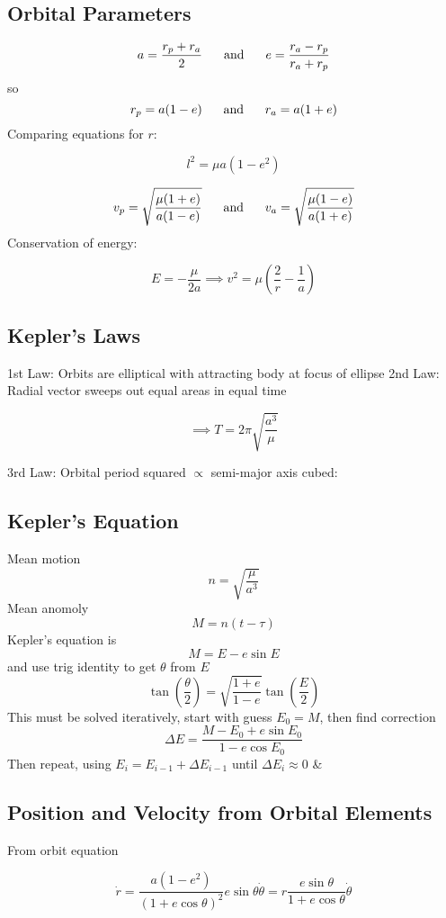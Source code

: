 \documentclass[table,cmyk,fleqn]{article}
\begin{document}
\begin{longtable}
\vspace{4cm}


\tabularnewline\hline
\section*{Orbital Parameters}
\[a=\frac{r_p+r_a}{2}\text{\hspace{0.6cm}and\hspace{0.6cm}}e=\frac{r_a-r_p}{r_a+r_p}\]
so
\[r_p=a(1-e)\text{\hspace{0.6cm}and\hspace{0.6cm}}r_a=a(1+e)\]
Comparing equations for $r$:
\begin{boldmath}\[l^2 = \mu a(1-e^2)\]\end{boldmath}
\[v_p = \sqrt{\frac{\mu(1+e)}{a(1-e)}}\text{\hspace{0.6cm}and\hspace{0.6cm}}v_a = \sqrt{\frac{\mu(1-e)}{a(1+e)}}\]
Conservation of energy:
\begin{boldmath}\[E = -\frac{\mu}{2a} \implies v^2 = \mu\left(\frac{2}{r}-\frac{1}{a}\right)\]\end{boldmath}
\subsection*{Kepler's Laws}
1st Law: Orbits are elliptical with attracting body at focus of ellipse
\newline
\newline
2nd Law: Radial vector sweeps out equal areas in equal time

\[\implies T = 2\pi\sqrt{\frac{a^3}{\mu}} \]

3rd Law: Orbital period squared $\propto$ semi-major axis cubed:
\subsection*{Kepler's Equation}
Mean motion
\[n=\sqrt{\frac{\mu}{a^3}}\]
Mean anomoly
\[M=n(t-\tau)\]
Kepler's equation is
\[M=E-e\sin E\]
and use trig identity to get $\theta$ from $E$
\[\tan \left(\frac{\theta}{2}\right) = \sqrt{\frac{1+e}{1-e}}\tan \left(\frac{E}{2}\right)\]
This must be solved iteratively, start with guess $E_0 = M$, then find correction
\[\Delta E = \frac{M-E_0+e\sin E_0}{1-e\cos E_0}\]
Then repeat, using $E_i = E_{i-1}+\Delta E_{i-1}$ until $\Delta E_i \approx 0$
&
\subsection*{Position and Velocity from Orbital Elements}
From orbit equation
\begin{boldmath}\[\dot{r} = \frac{a(1-e^2)}{(1+e\cos \theta)^2} e\sin \theta \dot{\theta} = r\frac{e\sin \theta}{1+e\cos \theta} \dot{\theta}\]\end{boldmath}


\end{longtable}
\end{document}
